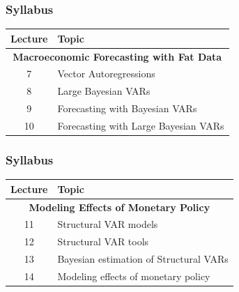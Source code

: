 \documentclass[notes,blackandwhite,mathsans]{beamer}
\begin{document}
\begin{frame}
\frametitle{Syllabus}

\begin{center}
\begin{tabular}{ c l}
\toprule 
Lecture & Topic \\
\midrule
\multicolumn{2}{c}{\textbf{Macroeconomic Forecasting with Fat Data}}\\
7  & Vector Autoregressions \\
8  & {\color{mcxs2}Large Bayesian VARs} \\
9  & {\color{mcxs2}Forecasting with Bayesian VARs} \\
10  & {\color{mcxs2}Forecasting with Large Bayesian VARs} \\[1ex]
\bottomrule
\end{tabular}
\end{center}

\end{frame}


\begin{frame}
\frametitle{Syllabus}
\small
\begin{center}
\begin{tabular}{ c l}
\toprule 
Lecture & Topic \\
\midrule
\multicolumn{2}{c}{\textbf{Modeling Effects of Monetary Policy}}\\
11  & {\color{mcxs2}Structural VAR} models \\
12  & {\color{mcxs2}Structural VAR} tools \\
13  & {\color{mcxs2}Bayesian estimation  of Structural VARs} \\
14  & {\color{mcxs2}Modeling effects of monetary policy} \\[1ex]
\bottomrule
\end{tabular}
\end{center}

\end{frame}
\end{document}
